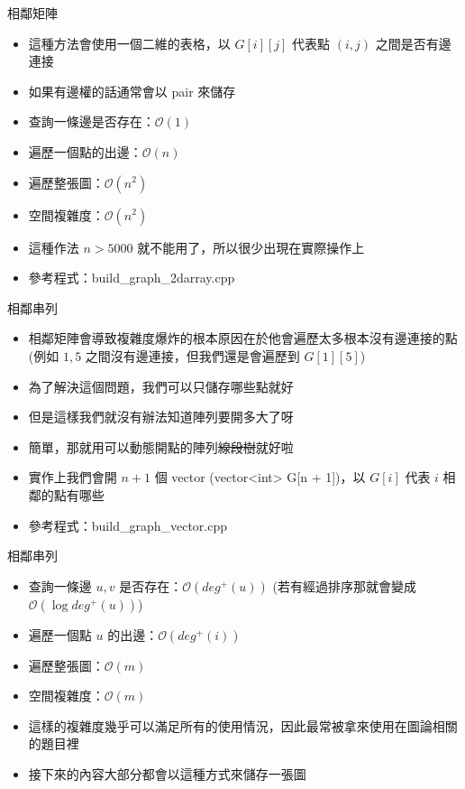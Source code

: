 \documentclass[aspectratio=169]{beamer}
\begin{document}
    \begin{frame}{相鄰矩陣}
        \begin{itemize}
            \item<1-> 這種方法會使用一個二維的表格，以 $G[i][j]$ 代表點 $(i, j)$ 之間是否有邊連接
            \item<2-> 如果有邊權的話通常會以 pair 來儲存
            \item<3-> 查詢一條邊是否存在：$\mathcal{O}(1)$
            \item<3-> 遍歷一個點的出邊：$\mathcal{O}(n)$
            \item<3-> 遍歷整張圖：$\mathcal{O}(n^2)$
            \item<3-> 空間複雜度：$\mathcal{O}(n^2)$
            \item<4-> 這種作法 $n > 5000$ 就不能用了，所以很少出現在實際操作上
            \item<4-> 參考程式：build\_graph\_2darray.cpp
        \end{itemize}
    \end{frame}

    \begin{frame}{相鄰串列}
        \begin{itemize}
            \item<1-> 相鄰矩陣會導致複雜度爆炸的根本原因在於他會遍歷太多根本沒有邊連接的點 (例如 $1, 5$ 之間沒有邊連接，但我們還是會遍歷到 $G[1][5]$)
            \item<2-> 為了解決這個問題，我們可以只儲存哪些點就好
            \item<3-> 但是這樣我們就沒有辦法知道陣列要開多大了呀
            \item<4-> 簡單，那就用可以動態開點的陣列\sout{線段樹}就好啦
            \item<5-> 實作上我們會開 $n + 1$ 個 vector (vector<int> G[n + 1])，以 $G[i]$ 代表 $i$ 相鄰的點有哪些
            \item<5-> 參考程式：build\_graph\_vector.cpp
        \end{itemize}
    \end{frame}

    \begin{frame}{相鄰串列}
        \begin{itemize}
            \item<1-> 查詢一條邊 $u, v$ 是否存在：$\mathcal{O}(deg^+(u))$ (若有經過排序那就會變成 $\mathcal{O}(\log deg^+(u))$)
            \item<1-> 遍歷一個點 $u$ 的出邊：$\mathcal{O}(deg^+(i))$
            \item<1-> 遍歷整張圖：$\mathcal{O}(m)$
            \item<1-> 空間複雜度：$\mathcal{O}(m)$
            \item<2-> 這樣的複雜度幾乎可以滿足所有的使用情況，因此最常被拿來使用在圖論相關的題目裡
            \item<3-> 接下來的內容大部分都會以這種方式來儲存一張圖
        \end{itemize}
    \end{frame}
\end{document}
